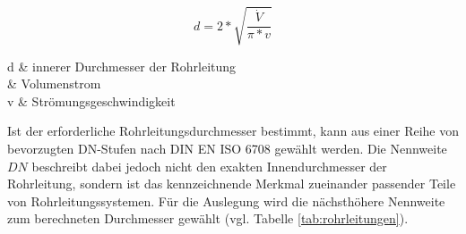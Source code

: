 \begin{equation}
	\label{eq:durchmesser_alternative}
	d = 2*\sqrt{\frac{\dot{V}}{\pi*v}}
\end{equation}
\begin{parameter}
	d			& innerer Durchmesser der Rohrleitung \\
			& Volumenstrom\\
	v			& Strömungsgeschwindigkeit\\
\end{parameter}

Ist der erforderliche Rohrleitungsdurchmesser bestimmt, kann aus einer Reihe von bevorzugten DN-Stufen nach DIN EN ISO 6708 gewählt werden. Die Nennweite $DN$ beschreibt dabei jedoch nicht den exakten Innendurchmesser der Rohrleitung, sondern ist das kennzeichnende Merkmal zueinander passender Teile von Rohrleitungssystemen. Für die Auslegung wird die nächsthöhere Nennweite zum berechneten Durchmesser gewählt (vgl. Tabelle \ref{tab:rohrleitungen}).\cite{Ignatowitz.2015} 

